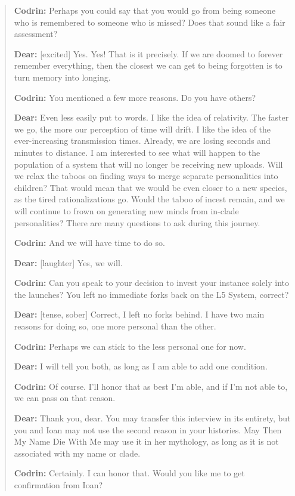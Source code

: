 \begin{quote}
\textbf{Codrin:} Perhaps you could say that you would go from being someone who is remembered to someone who is missed? Does that sound like a fair assessment?

\textbf{Dear:} {[}excited{]} Yes. Yes! That is it precisely. If we are doomed to forever remember everything, then the closest we can get to being forgotten is to turn memory into longing.

\textbf{Codrin:} You mentioned a few more reasons. Do you have others?

\textbf{Dear:} Even less easily put to words. I like the idea of relativity. The faster we go, the more our perception of time will drift. I like the idea of the ever-increasing transmission times. Already, we are losing seconds and minutes to distance. I am interested to see what will happen to the population of a system that will no longer be receiving new uploads. Will we relax the taboos on finding ways to merge separate personalities into children? That would mean that we would be even closer to a new species, as the tired rationalizations go. Would the taboo of incest remain, and we will continue to frown on generating new minds from in-clade personalities? There are many questions to ask during this journey.

\textbf{Codrin:} And we will have time to do so.

\textbf{Dear:} {[}laughter{]} Yes, we will.

\textbf{Codrin:} Can you speak to your decision to invest your instance solely into the launches? You left no immediate forks back on the L5 System, correct?

\textbf{Dear:} {[}tense, sober{]} Correct, I left no forks behind. I have two main reasons for doing so, one more personal than the other.

\textbf{Codrin:} Perhaps we can stick to the less personal one for now.

\textbf{Dear:} I will tell you both, as long as I am able to add one condition.

\textbf{Codrin:} Of course. I'll honor that as best I'm able, and if I'm not able to, we can pass on that reason.

\textbf{Dear:} Thank you, dear. You may transfer this interview in its entirety, but you and Ioan may not use the second reason in your histories. May Then My Name Die With Me may use it in her mythology, as long as it is not associated with my name or clade.

\textbf{Codrin:} Certainly. I can honor that. Would you like me to get confirmation from Ioan?


\end{quote}
